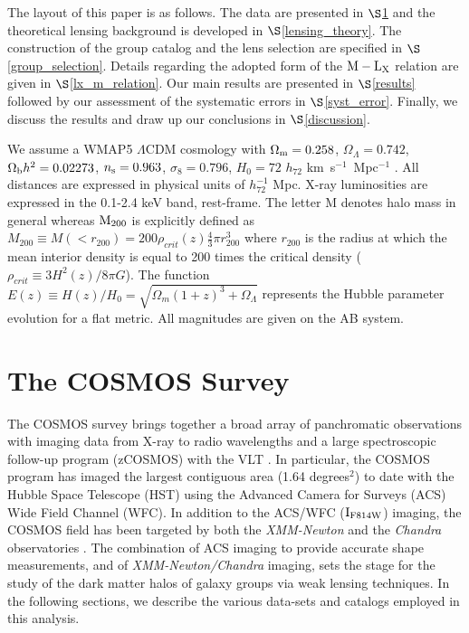 \documentclass[12pt]{emulateapj}
\newcommand{\mlx}{$\rm{M} - \rm{L}_{\rm X}$ }
\newcommand{\m}{$\rm{M}_{\rm 200}$ }
\begin{document}
The layout of this paper is as follows. The data are presented in
$\S$\ref{cosmos_survey} and the theoretical lensing background is
developed in $\S$\ref{lensing_theory}. The construction of the group
catalog and the lens selection are specified in
$\S$\ref{group_selection}. Details regarding the adopted form of the
\mlx relation are given in $\S$\ref{lx_m_relation}. Our main results
are presented in $\S$\ref{results} followed by our assessment of the
systematic errors in $\S$\ref{syst_error}. Finally, we discuss the
results and draw up our conclusions in $\S$\ref{discussion}.

We assume a WMAP5 $\Lambda$CDM cosmology with $\Omega_{\rm m}=0.258$,
$\Omega_\Lambda=0.742$, $\Omega_{\rm b}h^2=0.02273$, $n_{\rm
  s}=0.963$, $\sigma_{8}=0.796$, $H_0=72$ $h_{72}$
km~s$^{-1}$~Mpc$^{-1}$ \citep[][]{Hinshaw:2009}. All distances are
expressed in physical units of $h_{72}^{-1}$ Mpc. X-ray luminosities
are expressed in the 0.1-2.4 keV band, rest-frame. The letter M
denotes halo mass in general whereas \m is explicitly defined as
$M_{200}\equiv M(<r_{200})=200\rho_{crit}(z) \frac{4}{3}\pi r_{200}^3$
where $r_{200}$ is the radius at which the mean interior density is
equal to 200 times the critical density ($\rho_{crit}\equiv
3H^2(z)/8\pi G$). The function $E(z) \equiv H(z)/H_0 =
\sqrt{\Omega_{m}(1+z)^3+\Omega_{\Lambda}}$ represents the Hubble
parameter evolution for a flat metric. All magnitudes are given on the
AB system.


\section{The COSMOS Survey}\label{cosmos_survey}

The COSMOS survey brings together a broad array of panchromatic
observations with imaging data from X-ray to radio wavelengths and a
large spectroscopic follow-up program (zCOSMOS) with the VLT
\citep{Scoville:2007,Koekemoer:2007,Lilly:2007}. In particular, the
COSMOS program has imaged the largest contiguous area (1.64
degrees$^2$) to date with the Hubble Space Telescope (HST) using the
Advanced Camera for Surveys (ACS) Wide Field Channel (WFC). In
addition to the ACS/WFC ($\rm{I}_{F814W}$) imaging, the COSMOS field
has been targeted by both the {\sl XMM-Newton} \citep[1.5
Ms,][]{Hasinger:2007,Cappelluti:2009} and the {\sl Chandra}
observatories \citep[1.8 Ms,][]{Elvis:2009}. The combination of ACS
imaging to provide accurate shape measurements, and of {\sl
  XMM-Newton/Chandra} imaging, sets the stage for the study of the
dark matter halos of galaxy groups via weak lensing techniques. In the
following sections, we describe the various data-sets and catalogs
employed in this analysis.
\end{document}
